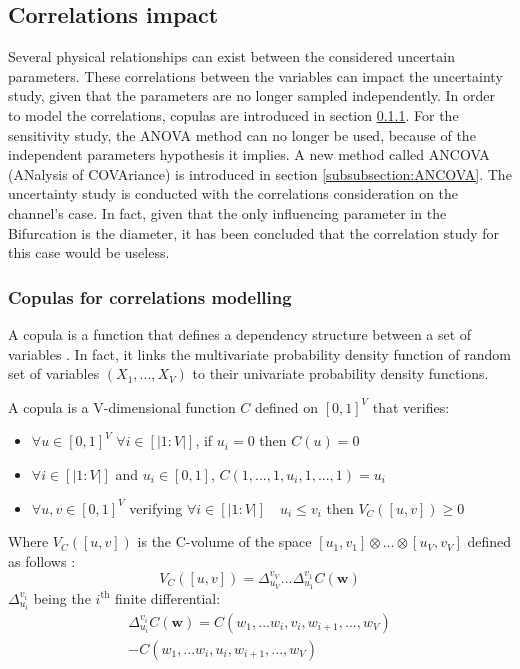 \subsection{Correlations impact}
Several physical relationships can exist between the considered uncertain parameters. These correlations between the variables can impact the uncertainty study, given that the parameters are no longer sampled independently. In order to model the correlations, copulas are introduced in section \ref{subsubsection:copulas}. For the sensitivity study, the ANOVA method can no longer be used, because of the independent parameters hypothesis it implies. A new method called ANCOVA (ANalysis of COVAriance) is introduced in section \ref{subsubsection:ANCOVA}. The uncertainty study is conducted with the correlations consideration on the channel's case. In fact, given that the only influencing parameter in the Bifurcation is the diameter, it has been concluded that the correlation study for this case would be useless.  

\subsubsection{Copulas for correlations modelling}
\label{subsubsection:copulas}
A copula is a function that defines a dependency structure between a set of variables \cite{bib5}. In fact, it links the multivariate probability density function of random set of variables $(X_1,...,X_V)$ to their univariate probability density functions. 

A copula is a V-dimensional function $C$ defined on $[0,1]^V$ that verifies:
\begin{itemize}
\item $\forall u \in [0,1]^V$ $\forall i \in [|1:V|]$, if $u_i=0$ then $C(u)=0$
\item $\forall i \in [|1:V|]$ and $u_i \in [0,1]$, $C(1,...,1,u_i,1,...,1)=u_i$
\item $\forall u,v \in [0,1]^V$ verifying $\forall i \in [|1:V|] \quad u_i \leq v_i$ then $V_C([u,v]) \geq 0$
\end{itemize}
Where $V_C([u,v])$ is the C-volume of the space $[u_1,v_1]\otimes\hdots\otimes[u_V,v_V]$ defined as follows : 
\begin{equation*}
V_C([u,v]) = \Delta^{v_V}_{u_V}...\Delta^{v_1}_{u_1} C(\textbf{w})
\end{equation*}
\hspace{0.6cm}$\Delta^{v_i}_{u_i}$ being the $i^{\text{th}}$  finite differential:
\begin{align*}
\Delta^{v_i}_{u_i} C(\textbf{w})= C(w_1,...w_i,v_i,w_{i+1},...,w_V) \\
-C(w_1,...w_i,u_i,w_{i+1},...,w_V)
\end{align*}

